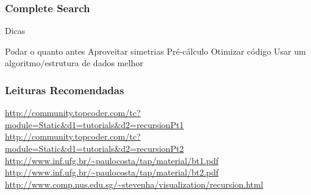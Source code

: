 

\begin{frame}
\frametitle{Complete Search}
\begin{block}{Dicas}
\begin{itemize}[<+->]
	\bitem Podar o quanto antes
	\bitem Aproveitar simetrias
	\bitem Pré-cálculo
	\bitem Otimizar código
	\bitem Usar um algoritmo/estrutura de dados melhor
\end{itemize}
\end{block}
\end{frame}

\begin{frame}
\frametitle{Leituras Recomendadas}

\begin{block}{}
\begin{itemize}
\scriptsize
	\bitem \url{http://community.topcoder.com/tc?module=Static&d1=tutorials&d2=recursionPt1}
	\bitem \url{http://community.topcoder.com/tc?module=Static&d1=tutorials&d2=recursionPt2}
	\bitem \url{http://www.inf.ufg.br/~paulocosta/tap/material/bt1.pdf}
	\bitem \url{http://www.inf.ufg.br/~paulocosta/tap/material/bt2.pdf}
	\bitem \url{http://www.comp.nus.edu.sg/~stevenha/visualization/recursion.html}
\end{itemize}
\end{block}

\end{frame}
